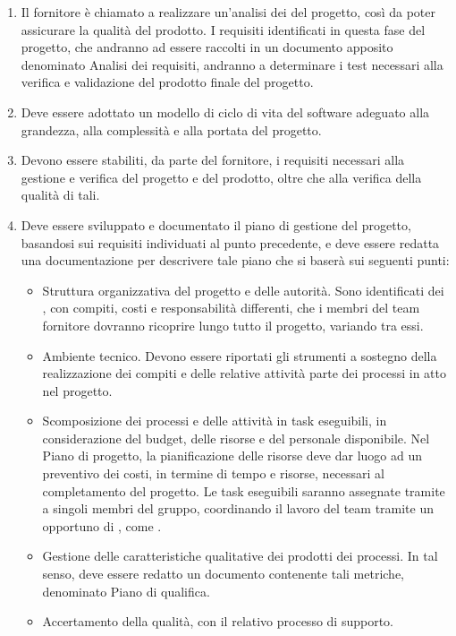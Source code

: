 \begin{enumerate}
    \item Il fornitore è chiamato a realizzare un'analisi dei  del progetto, così da poter assicurare la qualità del prodotto. I requisiti identificati in questa fase del progetto, che andranno ad essere raccolti in un documento apposito denominato Analisi dei requisiti, andranno a determinare i test necessari alla verifica e validazione del prodotto finale del progetto.
    \item Deve essere adottato un modello di ciclo di vita del software adeguato alla grandezza, alla complessità e alla portata del progetto.
    \item Devono essere stabiliti, da parte del fornitore, i requisiti necessari alla gestione e verifica del progetto e del prodotto, oltre che alla verifica della qualità di tali.
    \item Deve essere sviluppato e documentato il piano di gestione del progetto, basandosi sui requisiti individuati al punto precedente, e deve essere redatta una documentazione per descrivere tale piano che si baserà sui seguenti punti:
    \begin{itemize}
        \item Struttura organizzativa del progetto e delle autorità. Sono identificati dei , con compiti, costi e responsabilità differenti, che i membri del team fornitore dovranno ricoprire lungo tutto il progetto, variando tra essi.
        \item Ambiente tecnico. Devono essere riportati gli strumenti a sostegno della realizzazione dei compiti e delle relative attività parte dei processi in atto nel progetto.
        \item Scomposizione dei processi e delle attività in task eseguibili, in considerazione del budget, delle risorse e del personale disponibile. Nel Piano di progetto, la pianificazione delle risorse deve dar luogo ad un preventivo dei costi, in termine di tempo e risorse, necessari al completamento del progetto. Le task eseguibili saranno assegnate tramite  a singoli membri del gruppo, coordinando il lavoro del team tramite un opportuno  di , come .
        \item Gestione delle caratteristiche qualitative dei prodotti dei processi. In tal senso, deve essere redatto un documento contenente tali metriche, denominato Piano di qualifica.
        \item Accertamento della qualità, con il relativo processo di supporto.

\end{itemize}
\end{enumerate}
